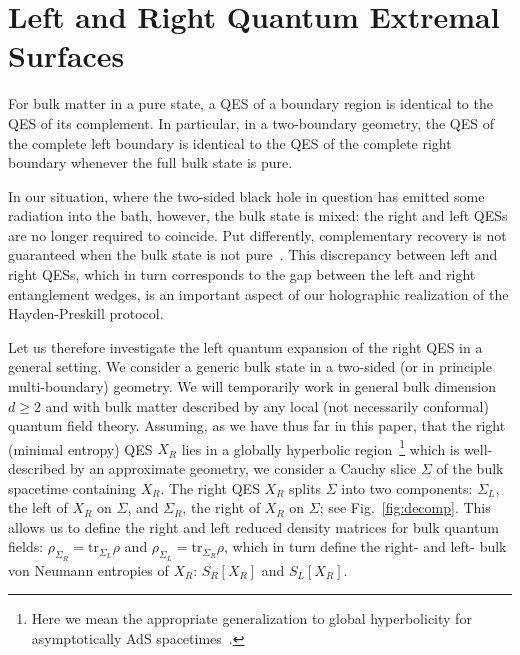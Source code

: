 \documentclass[12pt]{article}
\begin{document}
\section{Left and Right Quantum Extremal Surfaces}
\label{sec:gap}

For bulk matter in a pure state, a QES of a boundary region is identical to the QES of its complement. In particular, in a two-boundary geometry, the QES of the complete left boundary is identical to the QES of the complete right boundary whenever the full bulk state is pure.

In our situation, where the two-sided black hole in question has emitted some radiation into the bath, however, the bulk state is mixed: the right and left QESs are no longer required to coincide. Put differently, complementary recovery is not guaranteed when the bulk state is not pure~\cite{Harlow:2016vwg}.  This discrepancy between left and right QESs, which in turn corresponds to the gap between the left and right entanglement wedges, is an important aspect of our holographic realization of the Hayden-Preskill protocol.

Let us therefore investigate the left quantum expansion of the right QES in a general setting. We consider a generic bulk state in a two-sided (or in principle multi-boundary) geometry. We will temporarily work in general bulk dimension $d\geq 2$ and with bulk matter described by any local (not necessarily conformal) quantum field theory. Assuming, as we have thus far in this paper, that the right (minimal entropy) QES $X_{R}$ lies in a globally hyperbolic region~\footnote{Here we mean the appropriate generalization to global hyperbolicity for asymptotically AdS spacetimes~\cite{Ger70}.} which is well-described by an approximate geometry, we consider a Cauchy slice $\Sigma$ of the bulk spacetime containing $X_{R}$. The right QES $X_{R}$ splits $\Sigma$ into two components: $\Sigma_{L}$, the left of $X_{R}$ on $\Sigma$, and $\Sigma_{R}$, the right of $X_{R}$ on $\Sigma$; see Fig.~\ref{fig:decomp}. This allows us to define the right and left reduced density matrices for bulk quantum fields: $\rho_{\Sigma_{R}} = \mathrm{tr}_{\Sigma_{L}}\rho$ and $\rho_{\Sigma_{L}} = \mathrm{tr}_{\Sigma_{R}}\rho$, which in turn define the right- and left- bulk von Neumann entropies of $X_{R}$: $S_{R}[X_{R}]$ and $S_{L}[X_{R}]$.
\end{document}
